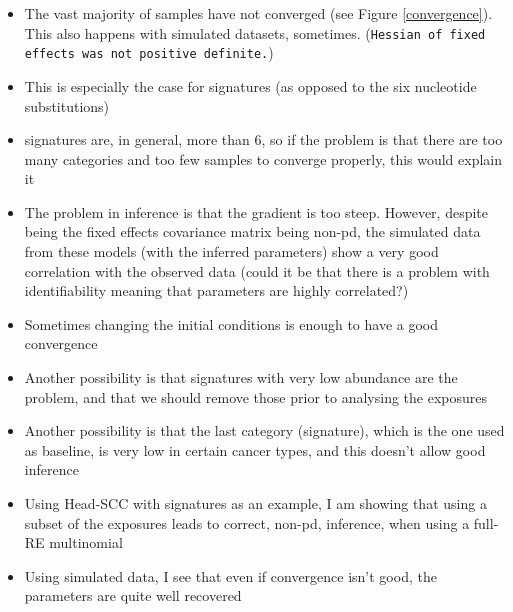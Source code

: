 \documentclass{article}
\begin{document}
\begin{itemize}
\item The vast majority of samples have not converged (see Figure \ref{convergence}). This also happens with simulated datasets, sometimes. (\texttt{Hessian of fixed effects was not positive definite.})
\item This is especially the case for signatures (as opposed to the six nucleotide substitutions)
\item signatures are, in general, more than 6, so if the problem is that there are too many categories and too few samples to converge properly, this would explain it
\item The problem in inference is that the gradient is too steep. However, despite being the fixed effects covariance matrix being non-pd, the simulated data from these models (with the inferred parameters) show a very good correlation with the observed data (could it be that there is a problem with identifiability meaning that parameters are highly correlated?)
\item Sometimes changing the initial conditions is enough to have a good convergence
\item Another possibility is that signatures with very low abundance are the problem, and that we should remove those prior to analysing the exposures
\item Another possibility is that the last category (signature), which is the one used as baseline, is very low in certain cancer types, and this doesn't allow good inference
\item Using Head-SCC with signatures as an example, I am showing that using a subset of the exposures leads to correct, non-pd, inference, when using a full-RE multinomial
\item Using simulated data, I see that even if convergence isn't good, the parameters are quite well recovered
\end{itemize}
\end{document}
